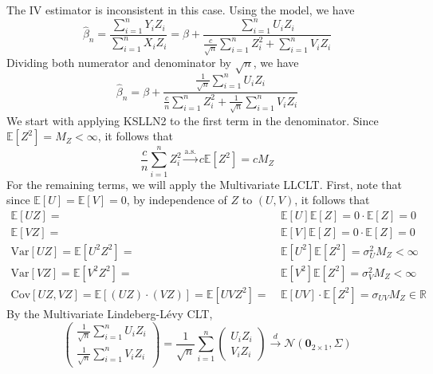 The IV estimator is inconsistent in this case. Using the model, we have
\[
  \widehat{\beta}_{n} = \frac{\sum_{i = 1}^{n} Y_{i} Z_{i}}{\sum_{i = 1}^{n}
  X_{i} Z_{i}} = \beta + \frac{\sum_{i = 1}^{n} U_{i} Z_{i}}{\frac{c}{\sqrt{n}}
  \sum_{i = 1}^{n} Z_{i}^{2} + \sum_{i = 1}^{n} V_{i} Z_{i}}
\]
Dividing both numerator and denominator by \(\sqrt{n}\), we have
\[
  \widehat{\beta}_{n} = \beta + \frac{\frac{1}{\sqrt{n}} \sum_{i = 1}^{n} U_{i}
  Z_{i}}{\frac{c}{n} \sum_{i = 1}^{n} Z_{i}^{2} + \frac{1}{\sqrt{n}} \sum_{i =
  1}^{n} V_{i} Z_{i}}
\]
We start with applying KSLLN2 to the first term in the denominator. Since
\(\mathbb{E} \left[ Z^{2} \right] = M_{Z} < \infty\), it follows that
\[
  \frac{c}{n} \sum_{i = 1}^{n} Z_{i}^{2} \overset{\mathrm{a.s.}}{\to} c
  \mathbb{E} \left[ Z^{2} \right] = c M_{Z}
\]
For the remaining terms, we will apply the Multivariate LLCLT. First, note that
since \(\mathbb{E} [U] = \mathbb{E} [V] = 0\), by independence of \(Z\) to \((U,
V)\), it follows that
\begin{align*}
  \mathbb{E} [U Z] = & \ \mathbb{E} [U] \mathbb{E} [Z] = 0 \cdot \mathbb{E} [Z]
  = 0 \\
  \mathbb{E} [V Z] = & \ \mathbb{E} [V] \mathbb{E} [Z] = 0 \cdot \mathbb{E} [Z]
  = 0 \\
  \mathrm{Var} [U Z] = \mathbb{E} \left[ U^{2} Z^{2} \right] = & \ \mathbb{E}
  \left[ U^{2} \right] \mathbb{E} \left[ Z^{2} \right] = \sigma_{U}^{2} M_{Z} <
  \infty \\
  \mathrm{Var} [V Z] = \mathbb{E} \left[ V^{2} Z^{2} \right] = & \ \mathbb{E}
  \left[ V^{2} \right] \mathbb{E} \left[ Z^{2} \right] = \sigma_{V}^{2} M_{Z} <
  \infty \\
  \mathrm{Cov} [U Z, V Z] = \mathbb{E} [(U Z) \cdot (V Z)] = \mathbb{E} \left[ U
  V Z^{2} \right] = & \ \mathbb{E} [U V] \cdot \mathbb{E} \left[ Z^{2} \right] =
  \sigma_{U V} M_{Z} \in \mathbb{R}
\end{align*}
By the Multivariate Lindeberg-L\'evy CLT,
\[
  \left( \begin{array}{c}
    \frac{1}{\sqrt{n}} \sum_{i = 1}^{n} U_{i} Z_{i} \\
    \frac{1}{\sqrt{n}} \sum_{i = 1}^{n} V_{i} Z_{i}
  \end{array} \right) = \frac{1}{\sqrt{n}} \sum_{i = 1}^{n}
  \left( \begin{array}{c}
    U_{i} Z_{i} \\
    V_{i} Z_{i}
  \end{array} \right) \overset{d}{\to} \mathcal{N} \left( \mathbf{0}_{2
  \times 1}, \Sigma \right)
\]
